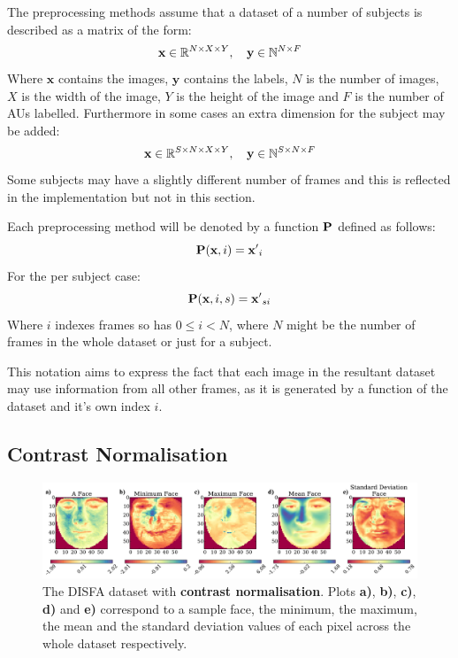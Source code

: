     The preprocessing methods assume that a dataset of a number of subjects
    is described as a matrix of the form:
    \begin{equation}
    {\bf x} \in \mathbb{R}^{N\times X \times Y},\quad {\bf y} \in \mathbb{N}^{N\times F}
    \end{equation}
    Where $\mathbf{x}$ contains the images, $\mathbf{y}$ contains the labels,
    $N$ is the number of images, $X$ is the width of the image, $Y$ is the height of the
    image and $F$ is the number of AUs labelled. Furthermore in some cases an extra dimension
    for the subject may be added:
    \begin{equation}
    {\bf x} \in \mathbb{R}^{S\times N\times X \times Y},\quad {\bf y} \in \mathbb{N}^{S\times N\times F}
    \end{equation}
    Some subjects may have a slightly different number of frames and this is reflected
    in the implementation but not in this section.

    Each preprocessing method will be denoted by a function ${\bf P}$ defined as follows:
    \begin{equation}
      {\bf P}({\bf x},i) = {\bf x'}_i
    \end{equation}
    For the per subject case:
    \begin{equation}
      {\bf P}({\bf x},i,s) = {\bf x'}_{si}
    \end{equation}
    Where $i$ indexes frames so has $0 \leq i < N$, where $N$ might be the number of frames
    in the whole dataset or just for a subject.

    This notation aims to express the fact that each image in the resultant dataset
    may use information from all other frames, as it is generated by a function of the dataset
    and it's own index $i$.

    \subsection{Contrast Normalisation}
      \begin{figure}[!h]
      \centering
      \includegraphics[width =\hsize]{figures/faces_contrast.pdf}
      \caption{The DISFA dataset with {\bf contrast normalisation}.
      Plots {\bf a)}, {\bf b)}, {\bf c)}, {\bf d)} and {\bf e)}
      correspond to a sample face, the minimum, the maximum,
      the mean and the standard deviation values of each pixel across
      the whole dataset respectively.}
      \label{fig:simple}
      \end{figure}

